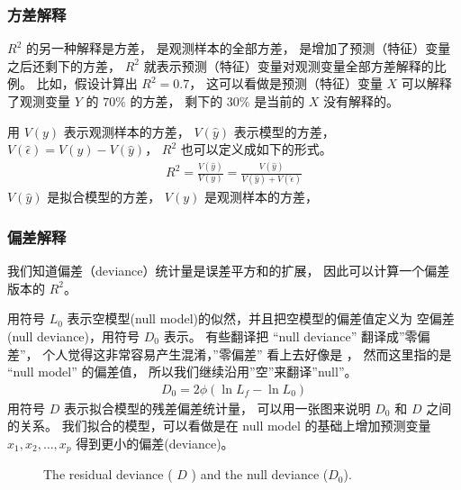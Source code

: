 \documentclass[letterpaper,10pt,english]{sphinxmanual}
\begin{document}
\subsubsection{方差解释}
\label{\detokenize{_u6a21_u578b_u8bc4_u4f30/content:id5}}
\(R^2\) 的另一种解释是方差，
 是观测样本的全部方差，
 是增加了预测（特征）变量之后还剩下的方差，
\(R^2\) 就表示预测（特征）变量对观测变量全部方差解释的比例。
比如，假设计算出 \(R^2=0.7\)，
这可以看做是预测（特征）变量 \(X\) 可以解释了观测变量 \(Y\) 的 \(70\%\) 的方差，
剩下的 \(30\%\) 是当前的 \(X\) 没有解释的。

用 \(V(y)\) 表示观测样本的方差，
\(V(\hat{y})\) 表示模型的方差，
\(V(\hat{\epsilon}) = V(y) - V(\hat{y})\)，
\(R^2\) 也可以定义成如下的形式。
\begin{equation}\label{equation:模型评估/content:模型评估/content:18}
\begin{split}R^2 = \frac{V(\hat{y})}{V(y)} = \frac{V(\hat{y})}{V(\hat{y}) + V(\hat{\epsilon})}\end{split}
\end{equation}
\(V(\hat{y})\) 是拟合模型的方差，
\(V(y)\) 是观测样本的方差，


\subsubsection{偏差解释}
\label{\detokenize{_u6a21_u578b_u8bc4_u4f30/content:id6}}
我们知道偏差（deviance）统计量是误差平方和的扩展，
因此可以计算一个偏差版本的 \(R^2\)。

用符号 \(L_0\) 表示空模型(null model)的似然，并且把空模型的偏差值定义为
空偏差(null deviance)，用符号 \(D_0\) 表示。
有些翻译把 “null deviance” 翻译成”零偏差”，
个人觉得这非常容易产生混淆，”零偏差” 看上去好像是  ，
然而这里指的是 “null model” 的偏差值，
所以我们继续沿用”空”来翻译”null”。
\begin{equation}\label{equation:模型评估/content:模型评估/content:19}
\begin{split}D_0 =2\phi(\ln L_f -\ln L_0)\end{split}
\end{equation}
用符号 \(D\) 表示拟合模型的残差偏差统计量，
可以用一张图来说明 \(D_0\) 和 \(D\) 之间的关系。
我们拟合的模型，可以看做是在 null model 的基础上增加预测变量 \(x_1,x_2,\dots,x_p\)
得到更小的偏差(deviance)。

\begin{figure}[htbp]
\centering
\capstart

\noindent{}
\caption{The residual deviance ( \(D\) ) and the null deviance (\(D_0\)).}\label{\detokenize{_u6a21_u578b_u8bc4_u4f30/content:id13}}\label{\detokenize{_u6a21_u578b_u8bc4_u4f30/content:fg-me-saturated-0012}}\end{figure}
\end{document}
